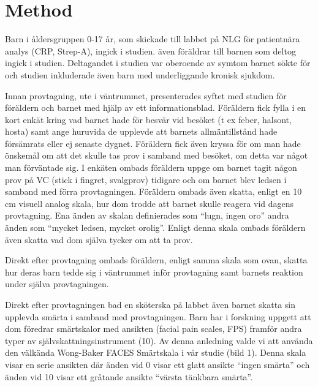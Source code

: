 \documentclass{nature}
\begin{document}
\section{Method}

Barn i \r{a}ldersgruppen 0-17 \r{a}r, som skickade till labbet p\r{a} NLG f\"or patientn\"ara
analys (CRP, Strep-A), ingick i studien. \"aven f\"or\"aldrar till barnen som deltog
ingick i studien. Deltagandet i studien var oberoende av symtom barnet s\"okte f\"or
och studien inkluderade \"aven barn med underliggande kronisk sjukdom.

Innan provtagning, ute i v\"antrummet, presenterades syftet med studien f\"or
f\"or\"aldern och barnet med hj\"alp av ett informationsblad. F\"or\"aldern fick fylla i
en kort enk\"at kring vad barnet hade f\"or besv\"ar vid bes\"oket (t ex feber, halsont,
hosta) samt ange huruvida de upplevde att barnets allm\"antillst\r{a}nd hade
f\"ors\"amrats eller ej senaste dygnet. F\"or\"aldern fick \"aven kryssa f\"or om man hade
\"onskem\r{a}l om att det skulle tas prov i samband med bes\"oket, om detta var n\r{a}got
man f\"orv\"antade sig. I enk\"aten ombads f\"or\"aldern uppge om barnet tagit n\r{a}gon prov
p\r{a} VC (stick i fingret, svalgprov) tidigare och om barnet blev ledsen i samband
med f\"orra provtagningen. F\"or\"aldern ombads \"aven skatta, enligt en 10 cm visuell
analog skala, hur dom trodde att barnet skulle reagera vid dagens provtagning.
Ena \"anden av skalan definierades som “lugn, ingen oro” andra \"anden som “mycket
ledsen, mycket orolig”. Enligt denna skala ombads f\"or\"aldern \"aven skatta vad dom
sj\"alva tycker om att ta prov.

Direkt efter provtagning ombads f\"or\"aldern, enligt samma skala som ovan, skatta
hur deras barn tedde sig i v\"antrummet inf\"or provtagning samt barnets reaktion
under sj\"alva provtagningen.

Direkt efter provtagningen bad en sk\"oterska p\r{a} labbet \"aven barnet skatta sin
upplevda sm\"arta i samband med provtagningen. Barn har i forskning uppgett att
dom f\"oredrar sm\"artskalor med ansikten (facial pain scales, FPS) framf\"or andra
typer av sj\"alvskattningsinstrument (10). Av denna anledning valde vi att anv\"anda
den v\"alk\"anda Wong-Baker FACES Sm\"artskala i v\r{a}r studie (bild 1). Denna skala
visar en serie ansikten d\"ar \"anden vid 0 visar ett glatt ansikte “ingen sm\"arta”
och \"anden vid 10 visar ett gr\r{a}tande ansikte “v\"arsta t\"ankbara sm\"arta”.
\end{document}
